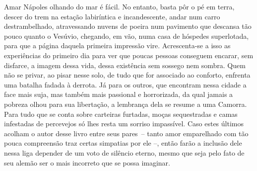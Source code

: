 
Amar Nápoles olhando do mar é fácil. No entanto, basta pôr o pé em
terra, descer do trem na estação labiríntica e incandescente, andar num
carro destrambelhado, atravessando nuvens de poeira num pavimento que
descansa tão pouco quanto o Vesúvio, chegando, em vão, numa casa de
hóspedes superlotada, para que a página daquela primeira impressão vire.
Acrescenta-se a isso as experiências do primeiro dia para ver que poucas
pessoas conseguem encarar, sem disfarce, a imagem dessa vida, dessa
existência sem sossego nem sombra. Quem não se privar, ao pisar nesse
solo, de tudo que for associado ao conforto, enfrenta uma batalha fadada
à derrota. Já para os outros, que encontram nessa cidade a face mais
suja, mas também mais passional e horrorizada, da qual jamais a pobreza
olhou para sua libertação, a lembrança dela se resume a uma Camorra.
Para tudo que se conta sobre carteiras furtadas, moças sequestradas e
camas infestadas de percevejos só lhes resta um sorriso impassível. Caso
estes últimos acolham o autor desse livro entre seus pares~-- tanto amor
emparelhado com tão pouca compreensão traz certas simpatias por ele --,
então farão a inclusão dele nessa liga depender de um voto de silêncio
eterno, mesmo que seja pelo fato de seu alemão ser o mais incorreto que
se possa imaginar.


